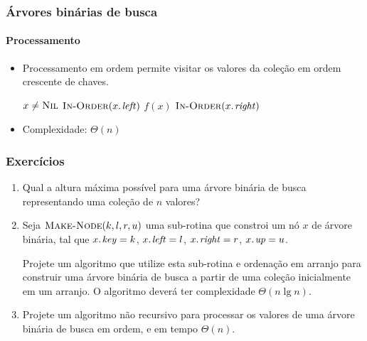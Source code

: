 \documentclass{beamer}
\begin{document}
\begin{frame}

\frametitle{Árvores binárias de busca}
\framesubtitle{Processamento}

\begin{itemize}
\item Processamento \alert{em ordem} permite visitar os valores da
  coleção em ordem crescente de chaves.

\begin{codebox}
  \li \If $x \neq \textnormal{\scshape Nil}$
  \li \Then $\proc{In-Order}(\attrib{x}{left})$
  \li $f(x)$
  \li $\proc{In-Order}(\attrib{x}{right})$
      \End
\end{codebox}

\item Complexidade: $\Theta(n)$
\end{itemize}

\end{frame}

\begin{frame}

\frametitle{Exercícios}

\begin{enumerate}

  \item Qual a altura máxima possível para uma árvore binária de busca
    representando uma coleção de $n$ valores?

  \item Seja $\textnormal{\scshape Make-Node}(k, l, r, u)$ uma sub-rotina que
    constroi um nó $x$ de árvore binária, tal que $\attrib{x}{key} =
    k$, $\attrib{x}{left} = l$, $\attrib{x}{right} = r$,
    $\attrib{x}{up} = u$.

    Projete um algoritmo que utilize esta sub-rotina e ordenação em arranjo para
    construir uma árvore binária de busca a partir de uma coleção inicialmente
    em um arranjo. O algoritmo deverá ter complexidade $\Theta(n \lg n)$.

  \item Projete um algoritmo não recursivo para processar os valores
    de uma árvore binária de busca em ordem, e em tempo $\Theta(n)$.
\end{enumerate}
\end{frame}
\end{document}
